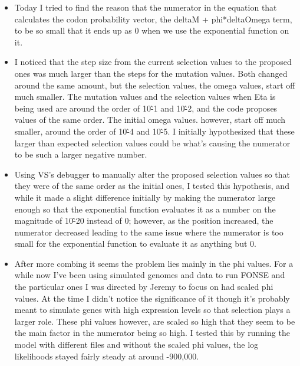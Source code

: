 \documentclass[11pt]{labbook}
\begin{document}
    \begin{itemize}
        \item Today I tried to find the reason that the numerator in the equation that calculates the codon probability vector, the deltaM + phi*deltaOmega term, to be so small that it ends up as 0 when we use the exponential function on it.
        \item I noticed that the step size from the current selection values to the proposed ones was much larger than the steps for the mutation values. Both changed around the same amount, but the selection values, the omega values, start off much smaller. The mutation values and the selection values when Eta is being used are around the order of 10\^-1 and 10\^-2, and the code proposes values of the same order. The initial omega values. however, start off much smaller, around the order of 10\^-4 and 10\^-5. I initially hypothesized that these larger than expected selection values could be what's causing the numerator to be such a larger negative number.
        \item Using VS's debugger to manually alter the proposed selection values so that they were of the same order as the initial ones, I tested this hypothesis, and while it made a slight difference initially by making the numerator large enough so that the exponential function evaluates it as a number on the magnitude of 10\^-20 instead of 0; however, as the position increased, the numerator decreased leading to the same issue where the numerator is too small for the exponential function to evaluate it as anything but 0.
        \item After more combing it seems the problem lies mainly in the phi values. For a while now I've been using simulated genomes and data to run FONSE and the particular ones I was directed by Jeremy to focus on had scaled phi values. At the time I didn't notice the significance of it though it's probably meant to simulate genes with high expression levels so that selection plays a larger role. These phi values however, are scaled so high that they seem to be the main factor in the numerator being so high. I tested this by running the model with different files and without the scaled phi values, the log likelihoods stayed fairly steady at around -900,000.
    \end{itemize}
    
\end{document}
